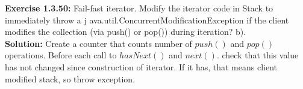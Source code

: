 \documentclass[11pt,fleqn]{article}
\begin{document}
\textbf{Exercise 1.3.50:} Fail-fast iterator. Modify the iterator code in Stack to immediately throw a
j ava.util.ConcurrentModificationException if the client modifies the collection
(via push() or pop()) during iteration? b).\\

\textbf{Solution:} Create a counter that counts number of $push()$ and $pop()$ operations. Before each call to $hasNext()$ and $next()$. check that this value has not changed since construction of iterator. If it has, that means client modified stack, so throw exception.
\end{document}
